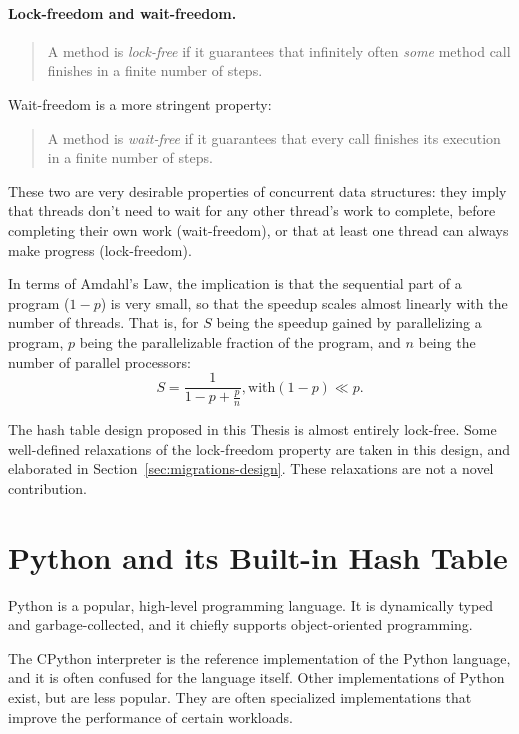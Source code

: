 \paragraph{Lock-freedom and wait-freedom.}
\begin{quote}
    A method is \emph{lock-free} if it guarantees that infinitely often \emph{some} method call finishes in a finite number of steps.
\end{quote}
Wait-freedom is a more stringent property:
\begin{quote}
    A method is \emph{wait-free} if it guarantees that every call finishes its execution in a finite number of steps.
\end{quote}

These two are very desirable properties of concurrent data structures: they imply that threads don't need to wait for any other thread's work to complete, before completing their own work (wait-freedom), or that at least one thread can always make progress (lock-freedom).

In terms of Amdahl's Law, the implication is that the sequential part of a program ($1 - p$) is very small, so that the speedup scales almost linearly with the number of threads.
That is, for $S$ being the speedup gained by parallelizing a program, $p$ being the parallelizable fraction of the program, and $n$ being the number of parallel processors:
\[
    S = \frac{1}{1 - p + \frac{p}{n}}, \text{with} (1 - p) \ll p.
\]

The hash table design proposed in this Thesis is almost entirely lock-free.
Some well-defined relaxations of the lock-freedom property are taken in this design, and elaborated in Section~\ref{sec:migrations-design}.
These relaxations are not a novel contribution.


\section{Python and its Built-in Hash Table}\label{sec:dict-intro}

Python is a popular, high-level programming language.
It is dynamically typed and garbage-collected, and it chiefly supports object-oriented programming.

The CPython interpreter is the reference implementation of the Python language, and it is often confused for the language itself.
Other implementations of Python exist, but are less popular.
They are often specialized implementations that improve the performance of certain workloads.

